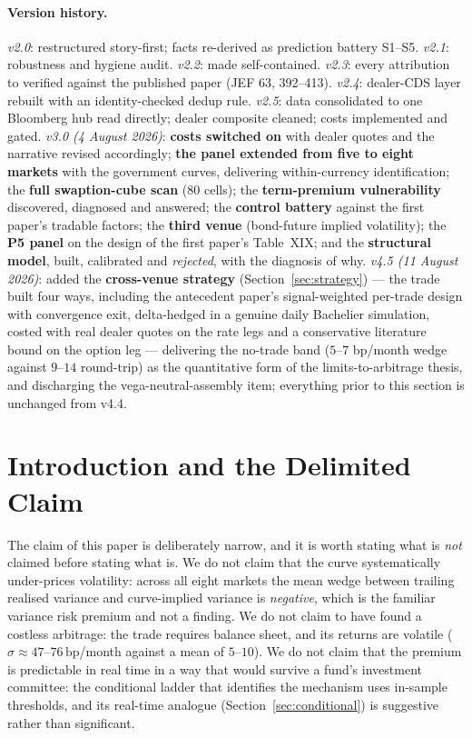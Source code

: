 \documentclass[11pt]{article}
\newcommand{\bp}{\,\mathrm{bp}}
\begin{document}
\paragraph{Version history.} \emph{v2.0}: restructured story-first; facts re-derived as prediction
battery S1--S5. \emph{v2.1}: robustness and hygiene audit. \emph{v2.2}: made self-contained.
\emph{v2.3}: every attribution to \citet{rr2021} verified against the published paper (JEF 63,
392--413). \emph{v2.4}: dealer-CDS layer rebuilt with an identity-checked dedup rule. \emph{v2.5}:
data consolidated to one Bloomberg hub read directly; dealer composite cleaned; costs implemented and
gated. \emph{v3.0 (4 August 2026)}: \textbf{costs switched on} with dealer quotes and the narrative
revised accordingly; \textbf{the panel extended from five to eight markets} with the government curves,
delivering within-currency identification; the \textbf{full swaption-cube scan} (80 cells); the
\textbf{term-premium vulnerability} discovered, diagnosed and answered; the \textbf{control battery}
against the first paper's tradable factors; the \textbf{third venue} (bond-future implied volatility);
the \textbf{P5 panel} on the design of the first paper's Table~XIX; and the \textbf{structural model},
built, calibrated and \emph{rejected}, with the diagnosis of why. \emph{v4.5 (11 August 2026)}: added
the \textbf{cross-venue strategy} (Section~\ref{sec:strategy}) --- the trade built four ways, including
the antecedent paper's signal-weighted per-trade design with convergence exit, delta-hedged in a
genuine daily Bachelier simulation, costed with real dealer quotes on the rate legs and a conservative
literature bound on the option leg --- delivering the no-trade band ($5$--$7$ bp/month wedge against
$9$--$14$ round-trip) as the quantitative form of the limits-to-arbitrage thesis, and discharging the
vega-neutral-assembly item; everything prior to this section is unchanged from v4.4.

\section{Introduction and the Delimited Claim}\label{sec:intro}

The claim of this paper is deliberately narrow, and it is worth stating what is \emph{not} claimed
before stating what is. We do not claim that the curve systematically under-prices volatility: across
all eight markets the mean wedge between trailing realised variance and curve-implied variance is
\emph{negative}, which is the familiar variance risk premium and not a finding. We do not claim to have
found a costless arbitrage: the trade requires balance sheet, and its returns are volatile
($\sigma \approx 47$--$76\bp$/month against a mean of $5$--$10$). We do not claim that the premium is
predictable in real time in a way that would survive a fund's investment committee: the conditional
ladder that identifies the mechanism uses in-sample thresholds, and its real-time analogue
(Section~\ref{sec:conditional}) is suggestive rather than significant.
\end{document}
